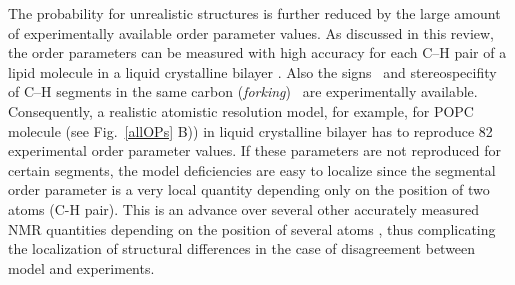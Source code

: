 \documentclass[aps,prl,superscriptaddress,twocolumn]{revtex4}
\begin{document}
The probability for unrealistic structures is further reduced by the large amount of experimentally 
available order parameter values. As discussed in this review, the order parameters can be measured
with high accuracy for each C--H pair of a lipid molecule in a liquid crystalline 
bilayer \cite{seelig77c,jacobs81,davis83,gross97,dvinskikh05a,ferreira13,botan15}.
Also the signs~\cite{hong95a,hong95b,gross97} and stereospecifity of C--H segments 
in the same carbon ({\it forking})~\cite{seelig75,gally81,engel81,gross97,dvinskikh05a,ferreira13}
are experimentally available. Consequently, a realistic atomistic resolution model,
for example, for POPC molecule (see Fig.~\ref{allOPs} B)) in liquid crystalline bilayer has to reproduce 82 experimental order parameter values.
If these parameters are not reproduced for certain segments, the model deficiencies are easy to localize
since the segmental order parameter is a very local quantity depending only on the position of two atoms (C-H pair).
This is an advance over several other accurately measured NMR quantities  
depending on the position of several atoms \cite{prakash10,chowdhary13}, thus complicating the localization of structural differences 
in the case of disagreement between model and experiments.
\end{document}
